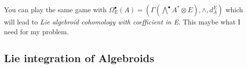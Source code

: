 You can play the same game with $\Omega_E^\bullet(A) = (\Gamma(\bigwedge^{\bullet} A^{*} \otimes E), \wedge, d_A^E)$ which will lead to \textit{Lie algebroid cohomology with coefficient in E}. This maybe what I need for my problem.
\subsection{Lie integration of Algebroids} %
\label{sub:lie_integration_of_algebroids}

